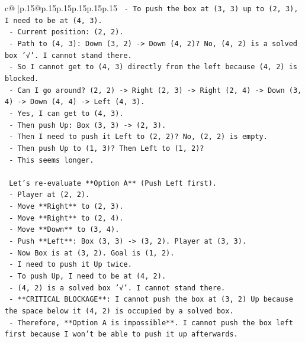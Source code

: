 \documentclass{article}
\begin{document}
{\begin{supertabular}{c@{$\;$}|p{.15\linewidth}@{}p{.15\linewidth}p{.15\linewidth}p{.15\linewidth}p{.15\linewidth}p{.15\linewidth}}
{{{\texttt{        {-} To push the box at (3, 3) up to (2, 3), I need to be at (4, 3).} \\
\texttt{        {-} Current position: (2, 2).} \\
\texttt{        {-} Path to (4, 3): Down (3, 2) {-}> Down (4, 2)? No, (4, 2) is a solved box '√'. I cannot stand there.} \\
\texttt{        {-} So I cannot get to (4, 3) directly from the left because (4, 2) is blocked.} \\
\texttt{        {-} Can I go around? (2, 2) {-}> Right (2, 3) {-}> Right (2, 4) {-}> Down (3, 4) {-}> Down (4, 4) {-}> Left (4, 3).} \\
\texttt{        {-} Yes, I can get to (4, 3).} \\
\texttt{        {-} Then push Up: Box (3, 3) {-}> (2, 3).} \\
\texttt{        {-} Then I need to push it Left to (2, 2)? No, (2, 2) is empty.} \\
\texttt{        {-} Then push Up to (1, 3)? Then Left to (1, 2)?} \\
\texttt{        {-} This seems longer.} \\
\\ 
\texttt{    Let's re{-}evaluate **Option A** (Push Left first).} \\
\texttt{    {-} Player at (2, 2).} \\
\texttt{    {-} Move **Right** to (2, 3).} \\
\texttt{    {-} Move **Right** to (2, 4).} \\
\texttt{    {-} Move **Down** to (3, 4).} \\
\texttt{    {-} Push **Left**: Box (3, 3) {-}> (3, 2). Player at (3, 3).} \\
\texttt{    {-} Now Box is at (3, 2). Goal is (1, 2).} \\
\texttt{    {-} I need to push it Up twice.} \\
\texttt{    {-} To push Up, I need to be at (4, 2).} \\
\texttt{    {-} (4, 2) is a solved box '√'. I cannot stand there.} \\
\texttt{    {-} **CRITICAL BLOCKAGE**: I cannot push the box at (3, 2) Up because the space below it (4, 2) is occupied by a solved box.} \\
\texttt{    {-} Therefore, **Option A is impossible**. I cannot push the box left first because I won't be able to push it up afterwards.} \\
\\ 
}}}
\end{supertabular}}
\end{document}
